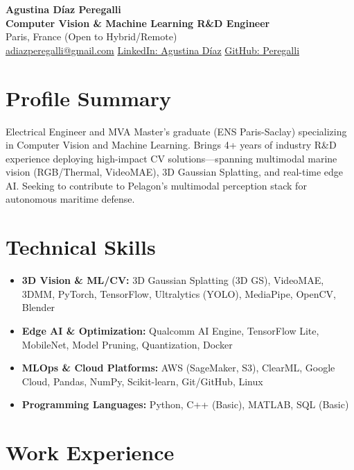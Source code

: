 \documentclass[10pt, a4paper]{article}
\begin{document}
\begin{center}
    {\LARGE \textbf{Agustina Díaz Peregalli}} \\ \vspace{2pt}
    {\large \textbf{Computer Vision \& Machine Learning R\&D Engineer}} \\ \vspace{2pt}
    Paris, France \textbar{} (Open to Hybrid/Remote) \\ \vspace{2pt}
    \href{mailto:adiazperegalli@gmail.com}{adiazperegalli@gmail.com} \textbar{} 
    \href{https://www.linkedin.com/in/agustina-diaz-peregalli/}{LinkedIn: Agustina Díaz} \textbar{} 
    \href{https://github.com/Peregalli}{GitHub: Peregalli}
\end{center}

\section{Profile Summary}
Electrical Engineer and MVA Master's graduate (ENS Paris-Saclay) specializing in Computer Vision and Machine Learning. Brings 4+ years of industry R\&D experience deploying high-impact CV solutions—spanning multimodal marine vision (RGB/Thermal, VideoMAE), 3D Gaussian Splatting, and real-time edge AI. Seeking to contribute to Pelagon's multimodal perception stack for autonomous maritime defense.

\section{Technical Skills}
\begin{itemize}
    \item \textbf{3D Vision \& ML/CV:} 3D Gaussian Splatting (3D GS), VideoMAE, 3DMM, PyTorch, TensorFlow, Ultralytics (YOLO), MediaPipe, OpenCV, Blender
    \item \textbf{Edge AI \& Optimization:} Qualcomm AI Engine, TensorFlow Lite, MobileNet, Model Pruning, Quantization, Docker
    \item \textbf{MLOps \& Cloud Platforms:} AWS (SageMaker, S3), ClearML, Google Cloud, Pandas, NumPy, Scikit-learn, Git/GitHub, Linux
    \item \textbf{Programming Languages:} Python, C++ (Basic), MATLAB, SQL (Basic)
\end{itemize}

\section{Work Experience}
\end{document}
